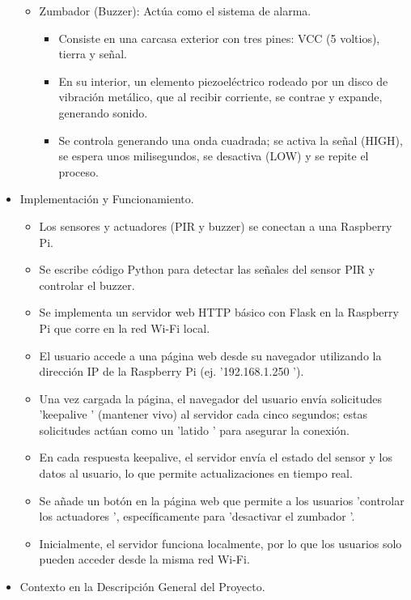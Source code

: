 \documentclass{report}
\begin{document}
\begin{itemize}
\begin{itemize}
        \item Zumbador (Buzzer): Actúa como el sistema de alarma.
        \begin{itemize}
            \item Consiste en una carcasa exterior con tres pines: VCC (5 voltios), tierra y señal.
            \item En su interior, un elemento piezoeléctrico rodeado por un disco de vibración metálico, que al recibir corriente, se contrae y expande, 
            generando sonido.
            \item Se controla generando una onda cuadrada; se activa la señal (HIGH), se espera unos milisegundos, se desactiva (LOW) y se repite el proceso.
        \end{itemize}
    \end{itemize}

\item Implementación y Funcionamiento.
    \begin{itemize}
        \item Los sensores y actuadores (PIR y buzzer) se conectan a una Raspberry Pi.
        \item Se escribe código Python para detectar las señales del sensor PIR y controlar el buzzer.
        \item Se implementa un servidor web HTTP básico con Flask en la Raspberry Pi que corre en la red Wi-Fi local.
        \item El usuario accede a una página web desde su navegador utilizando la dirección IP de la Raspberry Pi (ej.  '192.168.1.250 ').
        \item Una vez cargada la página, el navegador del usuario envía solicitudes  'keepalive ' (mantener vivo) al servidor cada cinco segundos; 
        estas solicitudes actúan como un  'latido ' para asegurar la conexión.
        \item En cada respuesta keepalive, el servidor envía el estado del sensor y los datos al usuario, lo que permite actualizaciones en tiempo real.
        \item Se añade un botón en la página web que permite a los usuarios  'controlar los actuadores ', específicamente para  'desactivar el zumbador '.
        \item Inicialmente, el servidor funciona localmente, por lo que los usuarios solo pueden acceder desde la misma red Wi-Fi.
    \end{itemize}

\item Contexto en la Descripción General del Proyecto.


\end{itemize}
\end{document}
